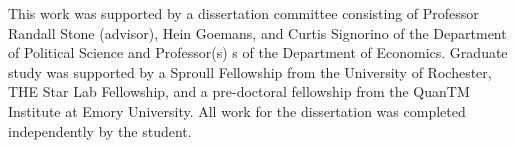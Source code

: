 This work was supported by a dissertation committee consisting of Professor Randall Stone (advisor), Hein Goemans, and Curtis Signorino of the Department of Political Science and Professor(s) s of the Department of Economics.
Graduate study was supported by a Sproull Fellowship from the University of Rochester,
THE Star Lab Fellowship, and a pre-doctoral fellowship from the QuanTM Institute at Emory University.
All work for the dissertation was completed independently by the student.


